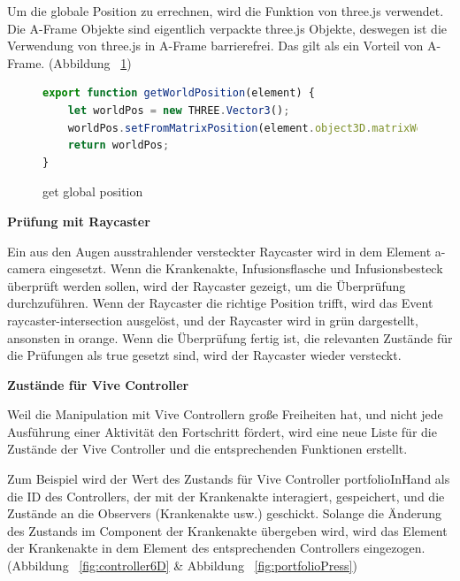   Um die globale Position zu errechnen, wird die Funktion von three.js verwendet. Die A-Frame Objekte sind eigentlich verpackte three.js Objekte, deswegen ist die Verwendung von three.js in A-Frame barrierefrei. Das gilt als ein Vorteil von A-Frame. (Abbildung ~\ref{fig:getWorldPosition})
  
\begin{figure}[ht]
\vspace*{1em}
\centering
\caption[get global position]{get global position}
\begin{lstlisting}[language=JavaScript, style=htmlcssjs]
export function getWorldPosition(element) {
    let worldPos = new THREE.Vector3();
    worldPos.setFromMatrixPosition(element.object3D.matrixWorld);
    return worldPos;
}
\end{lstlisting}
\label{fig:getWorldPosition} 
\end{figure}
  
  \vspace{1em}
  \noindent
  \textbf{Prüfung mit Raycaster}
  \vspace{1em}
  
  \noindent
  Ein aus den Augen ausstrahlender versteckter Raycaster wird in dem Element {\selectfont a-camera} eingesetzt. Wenn die Krankenakte, Infusionsflasche und Infusionsbesteck überprüft werden sollen, wird der Raycaster gezeigt, um die Überprüfung durchzuführen. Wenn der Raycaster die richtige Position trifft, wird das Event {\selectfont raycaster-intersection} ausgelöst, und der Raycaster wird in grün dargestellt, ansonsten in orange. Wenn die Überprüfung fertig ist, die relevanten Zustände für die Prüfungen als {\selectfont true} gesetzt sind, wird der Raycaster wieder versteckt.
  
  \vspace{1em}
  \noindent
  \textbf{Zustände für Vive Controller}
  \vspace{1em}
  
  \noindent
  Weil die Manipulation mit Vive Controllern große Freiheiten hat, und nicht jede Ausführung einer Aktivität den Fortschritt fördert, wird eine neue Liste für die Zustände der Vive Controller und die entsprechenden Funktionen erstellt.
  
  Zum Beispiel wird der Wert des Zustands für Vive Controller {\selectfont portfolioInHand} als die ID des Controllers, der mit der Krankenakte interagiert, gespeichert, und die Zustände an die Observers (Krankenakte usw.) geschickt. Solange die Änderung des Zustands im Component der Krankenakte übergeben wird, wird das Element der Krankenakte in dem Element des entsprechenden Controllers eingezogen. (Abbildung ~\ref{fig:controller6D} \& Abbildung ~\ref{fig:portfolioPress})
  
